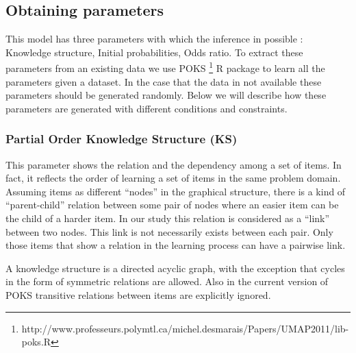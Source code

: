 \subsection{Obtaining parameters}
This model has three parameters with which the inference in possible : Knowledge structure, Initial probabilities, Odds ratio. To extract these parameters from an existing data we use POKS \footnote{http://www.professeurs.polymtl.ca/michel.desmarais/Papers/UMAP2011/lib-poks.R} R package to learn all the parameters given a dataset. In the case that the data in not available these parameters should be generated randomly. Below we will describe how these parameters are generated with different conditions and constraints.
\subsubsection{Partial Order Knowledge Structure (KS)}
This parameter shows the relation and the dependency among a set of items. In fact, it reflects the order of learning a set of items in the same problem domain. Assuming items as different ``nodes'' in the graphical structure, there is a kind of ``parent-child'' relation between some pair of nodes where an easier item can be the child of a harder item. In our study this relation is considered as a ``link'' between two nodes. This link is not necessarily exists between each pair. Only those items that show a relation in the learning process can have a pairwise link. 

A knowledge structure is a directed acyclic graph, with the exception that cycles in the form of symmetric relations are allowed. Also in the current version of POKS transitive relations between items are explicitly ignored. %




